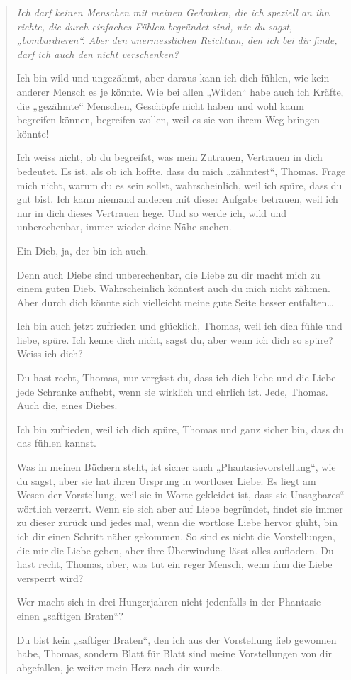 \documentclass[10pt,titlepage,a5paper]{book}
\newenvironment{tg}{\begin{quote}\em}{\end{quote}}
\begin{document}
\begin{tg}
Ich darf keinen Menschen mit meinen Gedanken, die ich speziell an ihn richte, die durch einfaches Fühlen begründet sind, wie du sagst, „bombardieren“. Aber den unermesslichen  Reichtum, den ich bei dir finde, darf ich auch den nicht verschenken?

Ich bin wild und ungezähmt, aber daraus kann ich dich fühlen, wie kein anderer Mensch es je könnte. Wie bei allen „Wilden“ habe auch ich Kräfte, die „gezähmte“ Menschen, Geschöpfe nicht haben und wohl kaum begreifen können, begreifen wollen, weil es sie von ihrem Weg bringen könnte!

Ich weiss nicht, ob du begreifst, was mein Zutrauen, Vertrauen in dich bedeutet. Es ist, als ob ich hoffte, dass du mich „zähmtest“, Thomas. Frage mich nicht, warum du es sein sollst, wahrscheinlich, weil ich spüre, dass du gut bist. Ich kann niemand anderen mit dieser Aufgabe betrauen, weil ich nur in dich dieses Vertrauen hege. Und so werde ich, wild und unberechenbar, immer wieder deine Nähe suchen.

Ein Dieb, ja, der bin ich auch.

Denn auch Diebe sind unberechenbar, die Liebe zu dir macht mich zu einem guten Dieb. Wahrscheinlich könntest auch du mich nicht zähmen. Aber durch dich könnte sich vielleicht meine gute Seite besser entfalten\dots 

Ich bin auch jetzt zufrieden und glücklich, Thomas, weil ich dich fühle und liebe, spüre. Ich kenne dich nicht, sagst du, aber wenn ich dich so spüre? Weiss ich dich?

Du hast recht, Thomas, nur vergisst du, dass ich dich liebe und die Liebe jede Schranke aufhebt, wenn sie wirklich und ehrlich ist. Jede, Thomas. Auch die, eines Diebes.

Ich bin zufrieden, weil ich dich spüre, Thomas und ganz sicher bin, dass du das fühlen kannst.

Was in meinen Büchern steht, ist sicher auch „Phantasievorstellung“, wie du sagst, aber sie hat ihren Ursprung in wortloser Liebe. Es liegt am Wesen der Vorstellung, weil sie in Worte gekleidet ist, dass sie Unsagbares“ wörtlich verzerrt. Wenn sie sich aber auf Liebe begründet, findet sie immer zu dieser zurück und jedes mal, wenn die wortlose Liebe hervor glüht, bin ich dir einen Schritt näher gekommen. So sind es nicht die Vorstellungen, die mir die Liebe geben, aber ihre Überwindung lässt alles auflodern. Du hast recht, Thomas, aber, was tut ein reger Mensch, wenn ihm die Liebe versperrt wird?

Wer macht sich in drei Hungerjahren nicht jedenfalls in der Phantasie einen „saftigen Braten“?

Du bist kein „saftiger Braten“, den ich aus der Vorstellung lieb gewonnen habe, Thomas, sondern Blatt für Blatt sind meine Vorstellungen von dir abgefallen, je weiter mein Herz nach dir wurde.
\end{tg}
\end{document}
